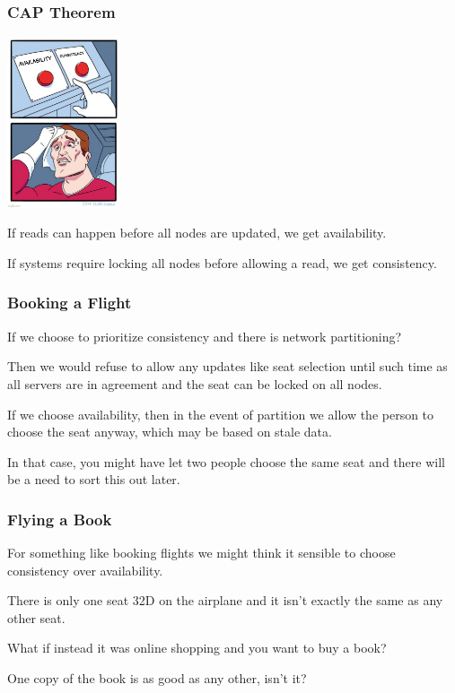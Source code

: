 \begin{frame}
\frametitle{CAP Theorem}

\begin{center}
	\includegraphics[width=0.25\textwidth]{images/cap.jpg}
\end{center}

If reads can happen before all nodes are updated, we get availability. 

If systems require locking all nodes before allowing a read, we get consistency.

\end{frame}



\begin{frame}
\frametitle{Booking a Flight}

If we choose to prioritize consistency and there is network partitioning? 

Then we would refuse to allow any updates like seat selection until such time as all servers are in agreement and the seat can be locked on all nodes. 

If we choose availability, then in the event of partition we allow the person to choose the seat anyway, which may be based on stale data. 

In that case, you might have let two people choose the same seat and there will be a need to sort this out later. 

\end{frame}

\begin{frame}
\frametitle{Flying a Book}
For something like booking flights we might think it sensible to choose consistency over availability.

There is only one seat 32D on the airplane and it isn't exactly the same as any other seat. 

What if instead it was online shopping and you want to buy a book? 

One copy of the book is as good as any other, isn't it?

\end{frame}



